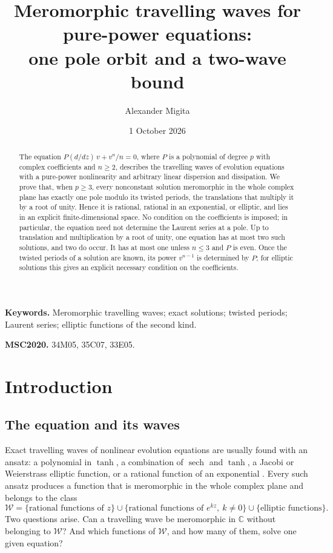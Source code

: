 \documentclass[11pt]{article}
\title{Meromorphic travelling waves for pure-power equations:\\
one pole orbit and a two-wave bound}
\author{Alexander Migita}
\date{1 October 2026}
\theoremstyle{definition}
\theoremstyle{remark}
\numberwithin{equation}{section}
\newcommand{\CC}{\mathbb C}
\newcommand{\Wclass}{\mathcal W}
\DeclareMathOperator{\sech}{sech}
\begin{document}
\maketitle


\begin{abstract}
The equation \(P(d/dz)\,v+v^n/n=0\), where \(P\) is a polynomial of
degree \(p\) with complex coefficients and \(n\ge2\), describes the
travelling waves of evolution equations with a pure-power nonlinearity
and arbitrary linear dispersion and dissipation. We prove that, when
\(p\ge3\), every nonconstant solution meromorphic in the whole complex
plane has exactly one pole modulo its twisted periods, the translations
that multiply it by a root of unity. Hence it is rational, rational in
an exponential, or elliptic, and lies in an explicit
finite-dimensional space. No condition on the coefficients is imposed;
in particular, the equation need not determine the Laurent series at a
pole. Up to translation and multiplication by a root of unity, one
equation has at most two such solutions, and two do occur. It has at
most one unless \(n\le3\) and \(P\) is even. Once the twisted
periods of a solution are known, its power \(v^{n-1}\) is determined by
\(P\); for elliptic solutions this gives an explicit necessary
condition on the coefficients.
\end{abstract}

\noindent\textbf{Keywords.} Meromorphic travelling waves; exact
solutions; twisted periods; Laurent series; elliptic functions of the
second kind.

\noindent\textbf{MSC2020.} 34M05, 35C07, 33E05.

\section{Introduction}\label{sec:intro}

\subsection{The equation and its waves}

Exact travelling waves of nonlinear evolution equations are usually
found with an ansatz: a polynomial in \(\tanh\), a combination of
\(\sech\) and \(\tanh\), a Jacobi or Weierstrass elliptic function, or a
rational function of an exponential
\citep{MusetteConte2003,Kudryashov2005Simplest,Kudryashov2010}. Every
such ansatz produces a function that is meromorphic in the whole
complex plane and belongs to the class
\[
 \Wclass=\{\text{rational functions of } z\}
 \cup\{\text{rational functions of } e^{kz},\ k\ne0\}
 \cup\{\text{elliptic functions}\}.
\]
Two questions arise. Can a travelling wave be meromorphic in \(\CC\)
without belonging to \(\Wclass\)? And which functions of \(\Wclass\),
and how many of them, solve one given equation?
\end{document}
